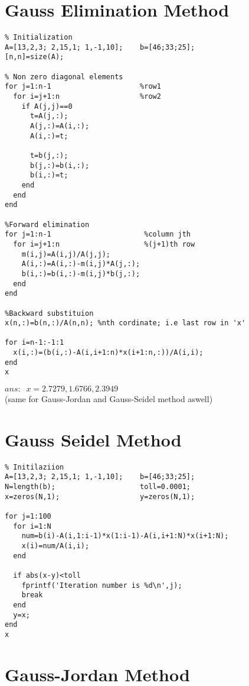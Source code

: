 \section{Gauss Elimination Method}

\begin{verbatim}
% Initialization
A=[13,2,3; 2,15,1; 1,-1,10];    b=[46;33;25];
[n,n]=size(A);

% Non zero diagonal elements
for j=1:n-1                     %row1
  for i=j+1:n                   %row2
    if A(j,j)==0
      t=A(j,:);
      A(j,:)=A(i,:);
      A(i,:)=t;

      t=b(j,:);
      b(j,:)=b(i,:);
      b(i,:)=t;
    end
  end
end

%Forward elimination
for j=1:n-1                      %column jth
  for i=j+1:n                    %(j+1)th row
    m(i,j)=A(i,j)/A(j,j);
    A(i,:)=A(i,:)-m(i,j)*A(j,:);
    b(i,:)=b(i,:)-m(i,j)*b(j,:);
  end
end

%Backward substituion
x(n,:)=b(n,:)/A(n,n); %nth cordinate; i.e last row in 'x'

for i=n-1:-1:1
  x(i,:)=(b(i,:)-A(i,i+1:n)*x(i+1:n,:))/A(i,i);
end
x

\end{verbatim}
\(ans:\;\;x =2.7279,1.6766,2.3949\)\\
(same for Gauss-Jordan and Gauss-Seidel method aswell)

\section{Gauss Seidel Method}

\begin{verbatim}
% Initilaziion
A=[13,2,3; 2,15,1; 1,-1,10];    b=[46;33;25];
N=length(b);                    toll=0.0001;
x=zeros(N,1);                   y=zeros(N,1);

for j=1:100
  for i=1:N
    num=b(i)-A(i,1:i-1)*x(1:i-1)-A(i,i+1:N)*x(i+1:N);
    x(i)=num/A(i,i);
  end

  if abs(x-y)<toll
    fprintf('Iteration number is %d\n',j);
    break
  end
  y=x;
end
x

\end{verbatim}

\section{Gauss-Jordan Method}

